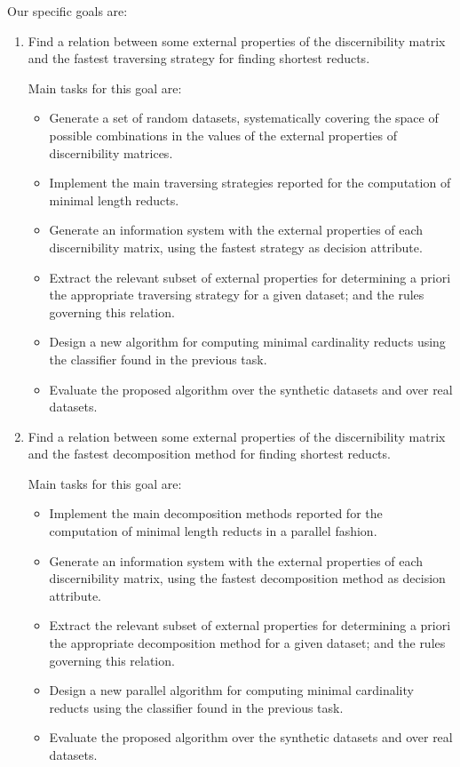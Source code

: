 \documentclass[11pt]{article}   %
\begin{document}
  Our specific goals are:
  \begin{enumerate}
  \item Find a relation between some external properties of the discernibility matrix and the fastest 
  		traversing strategy for finding shortest reducts.
  		
  		Main tasks for this goal are:
  		\begin{itemize}
  		\item Generate a set of random datasets, systematically covering the space of possible combinations in 
  			  the values of the external properties of discernibility matrices.
  		\item Implement the main traversing strategies reported for the computation of minimal length reducts.
  		\item Generate an information system with the external properties of each discernibility matrix, using 
  			  the fastest strategy as decision attribute.
  		\item Extract the relevant subset of external properties for determining a priori the appropriate 
  			  traversing strategy for a given dataset; and the rules governing this relation.
  		\item Design a new algorithm for computing minimal cardinality reducts using the classifier found in
  			  the previous task.
  		\item Evaluate the proposed algorithm over the synthetic datasets and over real datasets.
  		\end{itemize}
  	
  \item Find a relation between some external properties of the discernibility matrix and the fastest 
  		decomposition method for finding shortest reducts.
  		
  		Main tasks for this goal are:
  		\begin{itemize}
  		\item Implement the main decomposition methods reported for the computation of minimal length reducts
  			  in a parallel fashion.
  		\item Generate an information system with the external properties of each discernibility matrix, using 
  			  the fastest decomposition method as decision attribute.
  		\item Extract the relevant subset of external properties for determining a priori the appropriate 
  			  decomposition method for a given dataset; and the rules governing this relation.
  		\item Design a new parallel algorithm for computing minimal cardinality reducts using the classifier 
  			  found in the previous task.
  		\item Evaluate the proposed algorithm over the synthetic datasets and over real datasets.
  		\end{itemize}
  

\end{enumerate}
\end{document}
